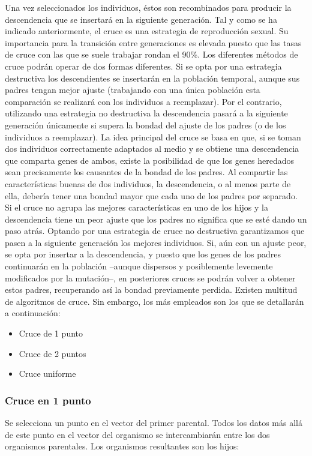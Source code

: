 Una vez seleccionados los individuos, éstos son recombinados para producir la descendencia que se insertará en la siguiente generación. Tal y como se ha indicado anteriormente, el cruce es una estrategia de reproducción sexual. Su importancia para la transición entre generaciones es elevada puesto que las tasas de cruce con las que se suele trabajar rondan el 90\%. Los diferentes métodos de cruce podrán operar de dos formas diferentes. Si se opta por una estrategia destructiva los descendientes se insertarán en la población temporal, aunque sus padres tengan mejor ajuste (trabajando con una única población esta comparación se realizará con los individuos a reemplazar). Por el contrario, utilizando una estrategia no destructiva la descendencia pasará a la siguiente generación únicamente si supera la bondad del ajuste de los padres (o de los individuos a reemplazar). La idea principal del cruce se basa en que, si se toman dos individuos correctamente adaptados al medio y se obtiene una descendencia que comparta genes de ambos, existe la posibilidad de que los genes heredados sean precisamente los causantes de la bondad de los padres. Al compartir las características buenas de dos individuos, la descendencia, o al menos parte de ella, debería tener una bondad mayor que cada uno de los padres por separado. Si el cruce no agrupa las mejores características en uno de los hijos y la descendencia tiene un peor ajuste que los padres no significa que se esté dando un paso atrás. Optando por una estrategia de cruce no destructiva garantizamos que pasen a la siguiente generación los mejores individuos. Si, aún con un ajuste peor, se opta por insertar a la descendencia, y puesto que los genes de los padres continuarán en la población –aunque dispersos y posiblemente levemente modificados por la mutación–, en posteriores cruces se podrán volver a obtener estos padres, recuperando así la bondad previamente perdida.
Existen multitud de algoritmos de cruce. Sin embargo, los más empleados
son los que se detallarán a continuación:
\begin{itemize}
\item Cruce de 1 punto
\item Cruce de 2 puntos
\item Cruce uniforme
\end{itemize}


\subsubsection{Cruce en 1 punto}\label{cruce1punto}
Se selecciona un punto en el vector del primer parental. Todos los datos más allá de este punto en el vector del organismo se intercambiarán entre los dos organismos parentales. Los organismos resultantes son los hijos:



